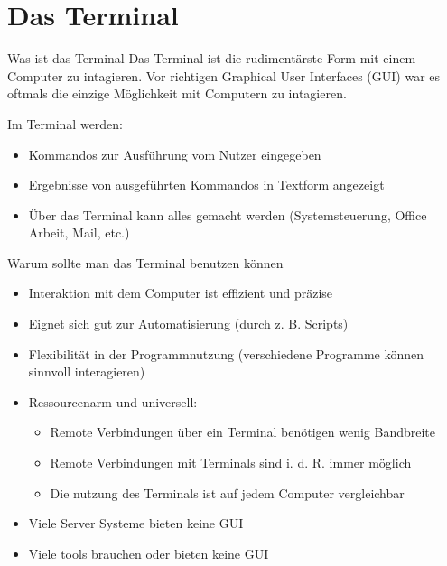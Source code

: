 \documentclass{setbeamer}
\begin{document}
\section{Das Terminal}

\begin{frame}{Was ist das Terminal}
    Das Terminal ist die rudimentärste Form mit einem Computer zu intagieren. Vor richtigen Graphical User Interfaces (GUI) war es oftmals die einzige Möglichkeit mit Computern zu intagieren.

    \vspace{0.3cm}

    Im Terminal werden:
    \begin{itemize}
        \item Kommandos zur Ausführung vom Nutzer eingegeben
        \item Ergebnisse von ausgeführten Kommandos in Textform angezeigt
        \item Über das Terminal kann alles gemacht werden (Systemsteuerung, Office Arbeit, Mail, etc.)
    \end{itemize}
\end{frame}

\begin{frame}{Warum sollte man das Terminal benutzen können}
    \begin{itemize}
        \item Interaktion mit dem Computer ist effizient und präzise
        \item Eignet sich gut zur Automatisierung (durch z. B. Scripts)
        \item Flexibilität in der Programmnutzung (verschiedene Programme können sinnvoll interagieren)
        \item Ressourcenarm und universell:
        \begin{itemize}
            \item Remote Verbindungen über ein Terminal benötigen wenig Bandbreite
            \item Remote Verbindungen mit Terminals sind i. d. R. immer möglich
            \item Die nutzung des Terminals ist auf jedem Computer vergleichbar
        \end{itemize}

        \item Viele Server Systeme bieten keine GUI
        \item Viele tools brauchen oder bieten keine GUI
    \end{itemize}
\end{frame}
\end{document}
